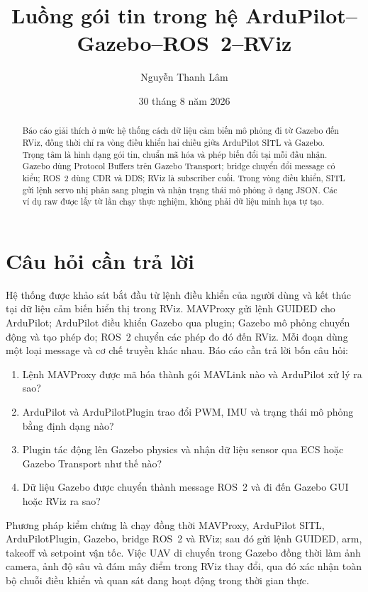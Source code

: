 \documentclass[a4paper]{article}
\title{Luồng gói tin trong hệ ArduPilot--Gazebo--ROS~2--RViz}
\author{Nguyễn Thanh Lâm}
\date{30 tháng 8 năm 2026}
\begin{document}
\maketitle

\begin{abstract}
Báo cáo giải thích ở mức hệ thống cách dữ liệu cảm biến mô phỏng đi từ Gazebo đến RViz, đồng thời chỉ ra vòng điều khiển hai chiều giữa ArduPilot SITL và Gazebo. Trọng tâm là hình dạng gói tin, chuẩn mã hóa và phép biến đổi tại mỗi đầu nhận. Gazebo dùng Protocol Buffers trên Gazebo Transport; bridge chuyển đổi message có kiểu; ROS~2 dùng CDR và DDS; RViz là subscriber cuối. Trong vòng điều khiển, SITL gửi lệnh servo nhị phân sang plugin và nhận trạng thái mô phỏng ở dạng JSON. Các ví dụ raw được lấy từ lần chạy thực nghiệm, không phải dữ liệu minh họa tự tạo.
\end{abstract}

\section{Câu hỏi cần trả lời}

Hệ thống được khảo sát bắt đầu từ lệnh điều khiển của người dùng và kết thúc tại dữ liệu cảm biến hiển thị trong RViz. MAVProxy gửi lệnh GUIDED cho ArduPilot; ArduPilot điều khiển Gazebo qua plugin; Gazebo mô phỏng chuyển động và tạo phép đo; ROS~2 chuyển các phép đo đó đến RViz. Mỗi đoạn dùng một loại message và cơ chế truyền khác nhau. Báo cáo cần trả lời bốn câu hỏi:

\begin{enumerate}
  \item Lệnh MAVProxy được mã hóa thành gói MAVLink nào và ArduPilot xử lý ra sao?
  \item ArduPilot và ArduPilotPlugin trao đổi PWM, IMU và trạng thái mô phỏng bằng định dạng nào?
  \item Plugin tác động lên Gazebo physics và nhận dữ liệu sensor qua ECS hoặc Gazebo Transport như thế nào?
  \item Dữ liệu Gazebo được chuyển thành message ROS~2 và đi đến Gazebo GUI hoặc RViz ra sao?
\end{enumerate}

Phương pháp kiểm chứng là chạy đồng thời MAVProxy, ArduPilot SITL, ArduPilotPlugin, Gazebo, bridge ROS~2 và RViz; sau đó gửi lệnh GUIDED, arm, takeoff và setpoint vận tốc. Việc UAV di chuyển trong Gazebo đồng thời làm ảnh camera, ảnh độ sâu và đám mây điểm trong RViz thay đổi, qua đó xác nhận toàn bộ chuỗi điều khiển và quan sát đang hoạt động trong thời gian thực.
\end{document}
